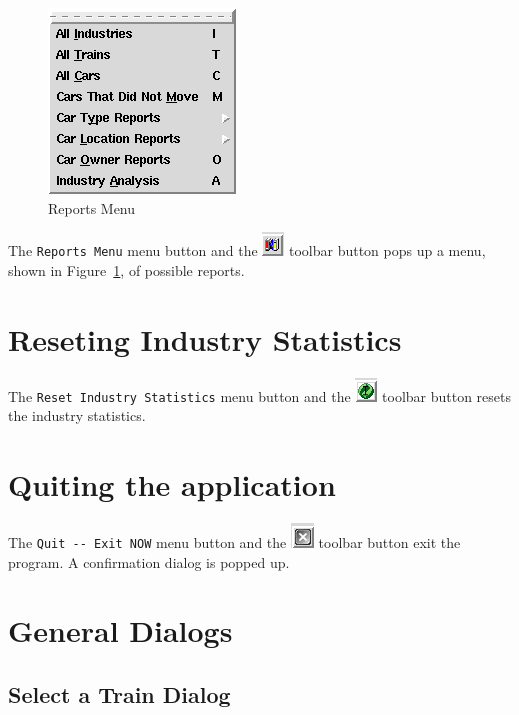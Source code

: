 \begin{figure}[hbpt]
\begin{centering}
\includegraphics{FCFReportsMenu.png}
\caption{Reports Menu}
\label{fig:fcf:reportsmenu}
\end{centering}
\end{figure}
The \verb=Reports Menu= menu button and the
\includegraphics{FCFReportsTool.png} toolbar button pops up a menu,
shown in Figure~\ref{fig:fcf:reportsmenu}, of
possible reports.

\section{Reseting Industry Statistics}

The \verb=Reset Industry Statistics= menu button and the
\includegraphics{FCFResetStatsTool.png} toolbar button resets the
industry statistics.

\section{Quiting the application}

The \verb=Quit -- Exit NOW= menu button and the
\includegraphics{FCFCloseTool.png} toolbar button exit the program. A
confirmation dialog is popped up.


\section{General Dialogs}

\subsection{Select a Train Dialog}
\label{sect:fcf:selecttraindialog}

